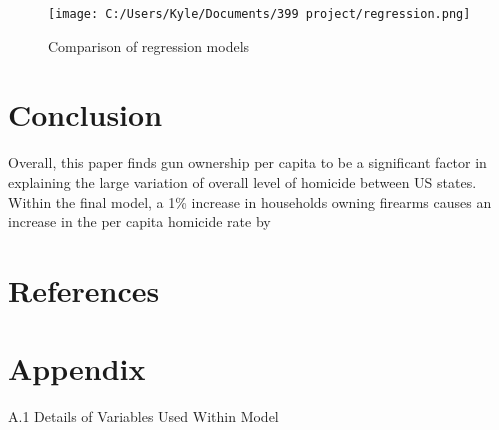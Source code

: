\documentclass[floatsintext,mask,man]{apa6}
\theoremstyle{definition}
\theoremstyle{definition}
\theoremstyle{definition}
\theoremstyle{remark}
\begin{document}
\begin{figure}
\centering
\texttt{[image: C:/Users/Kyle/Documents/399 project/regression.png]}
\caption{Comparison of regression models}
\end{figure}

\section{Conclusion}\label{conclusion}

Overall, this paper finds gun ownership per capita to be a significant
factor in explaining the large variation of overall level of homicide
between US states. Within the final model, a 1\% increase in households
owning firearms causes an increase in the per capita homicide rate by

\newpage

\section{References}\label{references}

\begingroup
\setlength{\parindent}{-0.5in} \setlength{\leftskip}{0.5in}

\hypertarget{refs}{}

\endgroup

\newpage

\section{Appendix}\label{appendix}

A.1 Details of Variables Used Within Model
\end{document}

